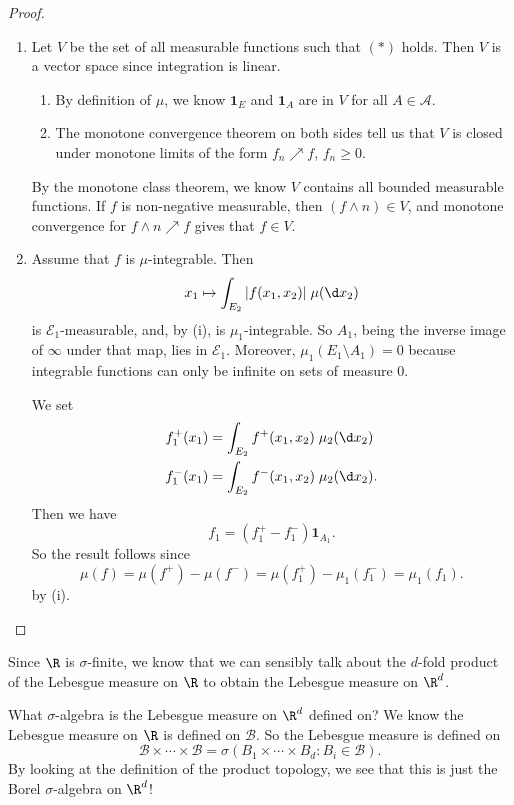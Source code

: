 \documentclass[a4paper]{article}
\begin{document}
\begin{proof}\leavevmode
  \begin{enumerate}
    \item Let $V$ be the set of all measurable functions such that $(*)$ holds. Then $V$ is a vector space since integration is linear.
      \begin{enumerate}
        \item By definition of $\mu$, we know $\mathbf{1}_E$ and $\mathbf{1}_A$ are in $V$ for all $A \in \mathcal{A}$.
        \item The monotone convergence theorem on both sides tell us that $V$ is closed under monotone limits of the form $f_n \nearrow f$, $f_n \geq 0$.
      \end{enumerate}
      By the monotone class theorem, we know $V$ contains all bounded measurable functions. If $f$ is non-negative measurable, then $(f \wedge n) \in V$, and monotone convergence for $f \wedge n \nearrow f$ gives that $f \in V$.
    \item Assume that $f$ is $\mu$-integrable. Then
      \[
        x_1 \mapsto \int_{E_2} |f(x_1, x_2)|\;\mu(\d x_2)
      \]
      is $\mathcal{E}_1$-measurable, and, by (i), is $\mu_1$-integrable. So $A_1$, being the inverse image of $\infty$ under that map, lies in $\mathcal{E}_1$. Moreover, $\mu_1(E_1 \setminus A_1) = 0$ because integrable functions can only be infinite on sets of measure $0$.

      We set
      \begin{align*}
        f_1^+(x_1) &= \int_{E_2} f^+(x_1, x_2)\;\mu_2(\d x_2)\\
        f_1^-(x_1) &= \int_{E_2} f^-(x_1, x_2)\;\mu_2(\d x_2).
      \end{align*}
      Then we have
      \[
        f_1 = (f_1^+ - f_1^-) \mathbf{1}_{A_1}.
      \]
      So the result follows since
      \[
        \mu(f) = \mu(f^+) - \mu(f^-) = \mu(f_1^+) - \mu_1(f_1^-) = \mu_1(f_1).
      \]
      by (i).\qedhere
  \end{enumerate}
\end{proof}

Since $\R$ is $\sigma$-finite, we know that we can sensibly talk about the $d$-fold product of the Lebesgue measure on $\R$ to obtain the Lebesgue measure on $\R^d$.

What $\sigma$-algebra is the Lebesgue measure on $\R^d$ defined on? We know the Lebesgue measure on $\R$ is defined on $\mathcal{B}$. So the Lebesgue measure is defined on
\[
  \mathcal{B} \times \cdots \times \mathcal{B} = \sigma(B_1 \times \cdots \times B_d: B_i \in \mathcal{B}).
\]
By looking at the definition of the product topology, we see that this is just the Borel $\sigma$-algebra on $\R^d$!
\end{document}

